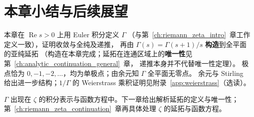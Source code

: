 \section*{本章小结与后续展望}\label{sec:gamma_summary}

本章在 $\operatorname{Re}s>0$ 上用 Euler 积分定义 $\Gamma$
（与第~\ref{ch:riemann_zeta_intro}~章工作定义一致），证明收敛与全纯及递推，
再由 $\Gamma(s)=\Gamma(s+1)/s$ \textbf{构造}到全平面的亚纯延拓
（构造在本章完成；延拓在连通区域上的\textbf{唯一性}见第~\ref{ch:analytic_continuation_general}~章，
递推本身并不代替唯一性定理）。
极点恰为 $0,-1,-2,\ldots$，均为单极点；由余元知 $\Gamma$ 全平面无零点。
余元与 Stirling 给出进一步结构；$1/\Gamma$ 的 Weierstrass 乘积证明见附录~\ref{app:weierstrass}（选读）。

$\Gamma$ 出现在 $\zeta$ 的积分表示与函数方程中。下一章给出解析延拓的定义与唯一性；
第~\ref{ch:riemann_zeta_continuation}~章再具体处理 $\zeta$ 的延拓与函数方程。
